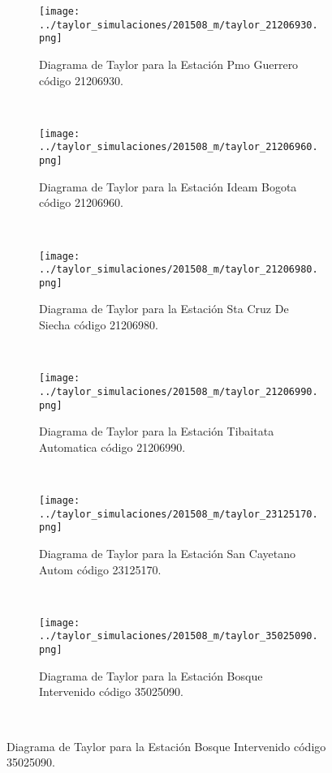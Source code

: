 \begin{figure}[H]\ContinuedFloat
\begin{subfigure}[normla]{0.5\textwidth}
\caption{Diagrama de Taylor para la Estación Pmo Guerrero código 21206930.}
\texttt{[image: ../taylor\_simulaciones/201508\_m/taylor\_21206930.png]}
\end{subfigure}
~
\begin{subfigure}[normla]{0.5\textwidth}
\caption{Diagrama de Taylor para la Estación Ideam Bogota código 21206960.}
\texttt{[image: ../taylor\_simulaciones/201508\_m/taylor\_21206960.png]}
\end{subfigure}
~
\begin{subfigure}[normla]{0.5\textwidth}
\caption{Diagrama de Taylor para la Estación Sta Cruz De Siecha código 21206980.}
\texttt{[image: ../taylor\_simulaciones/201508\_m/taylor\_21206980.png]}
\end{subfigure}
~
\begin{subfigure}[normla]{0.5\textwidth}
\caption{Diagrama de Taylor para la Estación Tibaitata Automatica código 21206990.}
\texttt{[image: ../taylor\_simulaciones/201508\_m/taylor\_21206990.png]}
\end{subfigure}
~
\begin{subfigure}[normla]{0.5\textwidth}
\caption{Diagrama de Taylor para la Estación San Cayetano Autom  código 23125170.}
\texttt{[image: ../taylor\_simulaciones/201508\_m/taylor\_23125170.png]}
\end{subfigure}
~
\begin{subfigure}[normla]{0.5\textwidth}
\caption{Diagrama de Taylor para la Estación Bosque Intervenido   código 35025090.}
\texttt{[image: ../taylor\_simulaciones/201508\_m/taylor\_35025090.png]}
\end{subfigure}
~
\end{figure}
           
